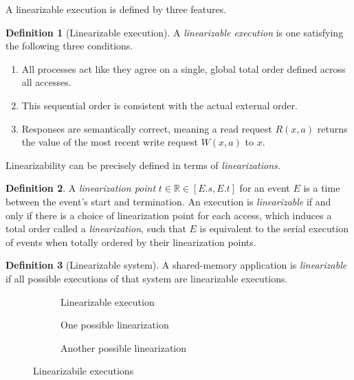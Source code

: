 \documentclass[]             %
{NASA}                       %
\theoremstyle{definition}
\newtheorem{definition}{Definition}[section]
\providecommand{\tightlist}{%
  \setlength{\itemsep}{0pt}\setlength{\parskip}{0pt}}
\begin{document}
A linearizable execution is defined by three features.

\begin{definition}[Linearizable execution]
  A \emph{linearizable execution} is one satisfying the following three conditions.
\begin{enumerate}
  \tightlist
\item
  All processes act like they agree on a single, global total order
  defined across all accesses.
\item
  This sequential order is consistent with the actual external order.
\item
  Responses are semantically correct, meaning a read request \(R(x, a)\)
  returns the value of the most recent write request \(W(x, a)\) to
  \(x\).
\end{enumerate}
\end{definition}

Linearizability can be precisely defined in terms of
\emph{linearizations.}

\begin{definition}
  A \emph{linearization point} $t \in \mathbb{R} \in [E.s, E.t]$ for an
  event $E$ is a time between the event's start and termination. An
  execution is \emph{linearizable} if and only if there is a choice of
  linearization point for each access, which induces a total order called a \emph{linearization},
  such that $E$ is equivalent to
  the serial execution of events when totally ordered by their
  linearization points.
\end{definition}

\begin{definition}[Linearizable system]
  A shared-memory application is \emph{linearizable} if all possible
  executions of that system are linearizable executions.
\end{definition}

\begin{figure}[p]
  \setlength\belowcaptionskip{5ex}

  \begin{subfigure}{1\textwidth}
    \centering
    
    \caption{Linearizable execution}
    \label{fig:linearEx1}
  \end{subfigure}

  \begin{subfigure}{1\textwidth}
    
    \caption{One possible linearization}
    \label{fig:linearEx11}
  \end{subfigure}

  \begin{subfigure}{1\textwidth}
    
    \caption{Another possible linearization}
    \label{fig:linearEx12}
  \end{subfigure}

  \caption{Linearizabile executions}
  \label{fig:linearEx}
\end{figure}
\end{document}
